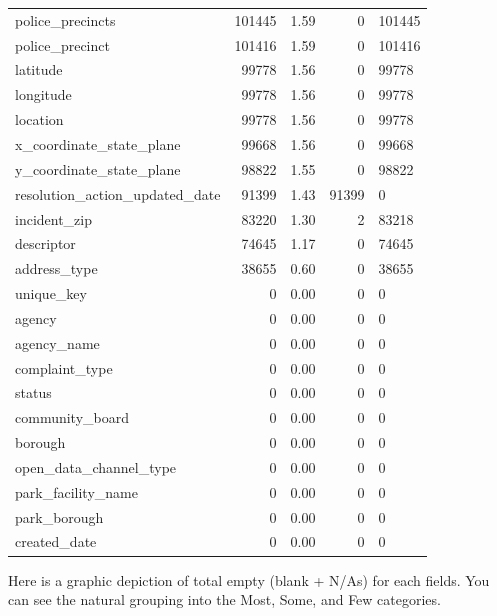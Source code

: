 \documentclass[12pt, titlepage]{article}
\begin{document}
\begin{table}[ht]
{\begin{tabular}{lrrrl}
		police\_precincts & 101445 & 1.59 & 0 & 101445 \\
		police\_precinct & 101416 & 1.59 & 0 & 101416 \\
		latitude & 99778 & 1.56 & 0 & 99778 \\
		longitude & 99778 & 1.56 & 0 & 99778 \\
		location & 99778 & 1.56 & 0 & 99778 \\
		x\_coordinate\_state\_plane & 99668 & 1.56 & 0 & 99668 \\
		y\_coordinate\_state\_plane & 98822 & 1.55 & 0 & 98822 \\
		resolution\_action\_updated\_date & 91399 & 1.43 & 91399 & 0 \\
		incident\_zip & 83220 & 1.30 & 2 & 83218 \\
		descriptor & 74645 & 1.17 & 0 & 74645 \\
		address\_type & 38655 & 0.60 & 0 & 38655 \\
		unique\_key & 0 & 0.00 & 0 & 0 \\
		agency & 0 & 0.00 & 0 & 0 \\
		agency\_name & 0 & 0.00 & 0 & 0 \\
		complaint\_type & 0 & 0.00 & 0 & 0 \\
		status & 0 & 0.00 & 0 & 0 \\
		community\_board & 0 & 0.00 & 0 & 0 \\
		borough & 0 & 0.00 & 0 & 0 \\
		open\_data\_channel\_type & 0 & 0.00 & 0 & 0 \\
		park\_facility\_name & 0 & 0.00 & 0 & 0 \\
		park\_borough & 0 & 0.00 & 0 & 0 \\
		created\_date & 0 & 0.00 & 0 & 0 \\
	\bottomrule
\end{tabular}
}
\end{table}

\FloatBarrier %

Here is a graphic depiction of total empty (blank + N/As) for each fields. You can see the natural grouping into the Most, Some, and Few categories. 
\end{document}

